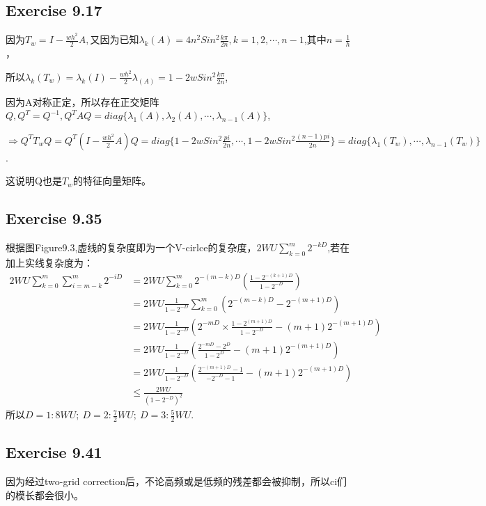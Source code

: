 \documentclass[UTF8]{ctexart}
\begin{document}
\subsection*{Exercise 9.17}
因为$T_w = I - \frac{wh^2}{2}A,$又因为已知$\lambda _k(A) = 4n^2 Sin^2 \frac{k\pi}{2n}, k=1,2,\cdots,n-1$,其中$ n = \frac{1}{h}$，

所以$\lambda _k (T_w) = \lambda _k (I) - \frac{wh^2}{2}\lambda _(A) = 1 - 2wSin^2 \frac{k\pi}{2n}$,

因为A对称正定，所以存在正交矩阵$Q, Q^T = Q^{-1}, Q^TAQ = diag\{\lambda_1(A), \lambda_2(A), \cdots, \lambda_{n-1}(A)\}$,

$\Rightarrow Q^TT_wQ = Q^T(I-\frac{wh^2}{2}A)Q = diag\{1-2wSin^2 \frac{pi}{2n}, \cdots, 1-2wSin^2 \frac{(n-1)pi}{2n}\} = diag\{\lambda_1(T_w), \cdots, \lambda_{n-1}(T_w)\}$.

这说明Q也是$T_w$的特征向量矩阵。

\subsection*{Exercise 9.35}
根据图Figure9.3,虚线的复杂度即为一个V-cirlce的复杂度，$2WU\sum_{k = 0}^{m} 2^{-kD} $,若在加上实线复杂度为：
\begin{align}
    2WU\sum_{k = 0}^{m} \sum_{i = m-k}^{m} 2^{-iD} &= 2WU\sum_{k=0}^{m} 2^{-(m-k)D}(\frac{1-2^{-(k+1)D}}{1-2^{-D}}) \\
                                &= 2WU\frac{1}{1-2^{-D}} \sum_{k=0}^{m} (2^{-(m-k)D} - 2^{-(m+1)D}) \\
                                &= 2WU\frac{1}{1-2^{-D}} (2^{-mD}\times \frac{1-2^{(m+1)D}}{1-2^{-D}} - (m+1)2^{-(m+1)D}) \\
                                &= 2WU\frac{1}{1-2^{-D}} (\frac{2^{-mD} - 2^D}{1-2^D} - (m+1)2^{-(m+1)D}) \\
                                &= 2WU\frac{1}{1-2^{-D}} (\frac{2^{-(m+1)D} - 1}{-2^{-D} -1} - (m+1)2^{-(m+1)D}) \\
                                &\leq \frac{2WU}{(1-2^{-D})^2}
\end{align}
所以$D=1:8WU;\  D=2:\frac{7}{2}WU;\ D=3:\frac{5}{2}WU$.

\subsection*{Exercise 9.41}
因为经过two-grid correction后，不论高频或是低频的残差都会被抑制，所以ci们的模长都会很小。
\end{document}
